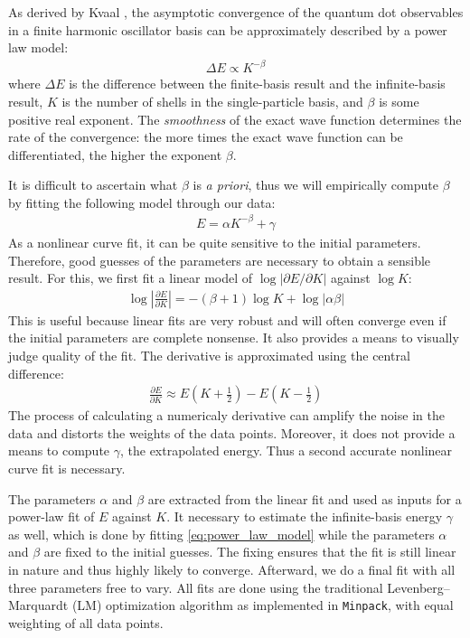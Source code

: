 As derived by Kvaal \cite{PhysRevB.80.045321,Kvaal2007}, the asymptotic convergence of the quantum dot observables in a finite harmonic oscillator basis can be approximately described by a power law model:
\begin{align*}
  \Delta E \propto K^{-\beta}
\end{align*}
where $\Delta E$ is the difference between the finite-basis result and the infinite-basis result, $K$ is the number of shells in the single-particle basis, and $\beta$ is some positive real exponent.  The \textit{smoothness} of the exact wave function determines the rate of the convergence: the more times the exact wave function can be differentiated, the higher the exponent $\beta$.

It is difficult to ascertain what $\beta$ is \textit{a priori}, thus we will empirically compute $\beta$ by fitting the following model through our data:
\begin{align} \label{eq:power_law_model}
  E = \alpha K^{-\beta} + \gamma
\end{align}
As a nonlinear curve fit, it can be quite sensitive to the initial parameters.  Therefore, good guesses of the parameters are necessary to obtain a sensible result.  For this, we first fit a linear model of $\log |\partial E / \partial K|$ against $\log K$:
\begin{align*}
  \log \left|\frac{\partial E}{\partial K}\right| = - (\beta + 1) \log K + \log|\alpha \beta|
\end{align*}
This is useful because linear fits are very robust and will often converge even if the initial parameters are complete nonsense.  It also provides a means to visually judge quality of the fit.  The derivative is approximated using the central difference:
\begin{align*}
  \frac{\partial E}{\partial K} \approx E\left(K + \frac{1}{2}\right) - E\left(K - \frac{1}{2}\right)
\end{align*}
The process of calculating a numericaly derivative can amplify the noise in the data and distorts the weights of the data points.  Moreover, it does not provide a means to compute $\gamma$, the extrapolated energy.  Thus a second accurate nonlinear curve fit is necessary.

The parameters $\alpha$ and $\beta$ are extracted from the linear fit and used as inputs for a power-law fit of $E$ against $K$.  It necessary to estimate the infinite-basis energy $\gamma$ as well, which is done by fitting \eqref{eq:power_law_model} while the parameters $\alpha$ and $\beta$ are fixed to the initial guesses.  The fixing ensures that the fit is still linear in nature and thus highly likely to converge.  Afterward, we do a final fit with all three parameters free to vary.  All fits are done using the traditional Levenberg--Marquardt (LM) optimization algorithm as implemented in \texttt{Minpack}, with equal weighting of all data points.

